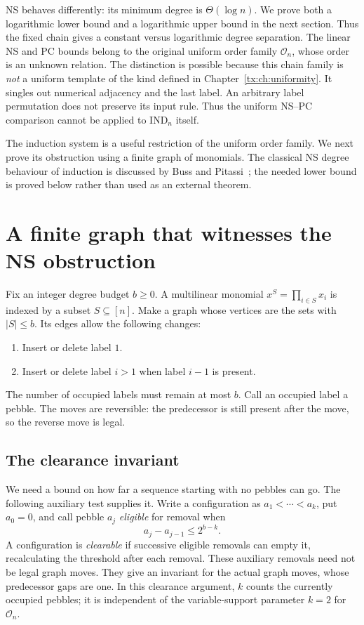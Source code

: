 \documentclass[11pt,a4paper,oneside,openany]{book}
\theoremstyle{definition}\newtheorem{definition}[theorem]{Definition}
\theoremstyle{remark}\newtheorem{remark}[theorem]{Remark}
\numberwithin{equation}{chapter}
\begin{document}
NS behaves differently: its minimum degree is $\Theta(\log n)$.
We prove both a logarithmic lower bound and a logarithmic upper bound
in the next section. Thus the fixed chain gives a constant versus
logarithmic degree separation. The linear NS and PC bounds belong
to the original uniform order family $\mathcal O_n$, whose order is
an unknown relation. The distinction is possible because this chain family is
\emph{not} a uniform template of the kind defined in Chapter~\ref{tx:ch:uniformity}.
It singles out numerical adjacency and the last label. An arbitrary
label permutation does not preserve its input rule. Thus the uniform
NS--PC comparison cannot be applied to $\mathrm{IND}_n$ itself.

The induction system is a useful restriction of the uniform order
family. We next prove its obstruction using a finite graph of
monomials. The classical NS degree behaviour of induction is discussed
by Buss and Pitassi~\cite{BussPitassiInduction}; the needed lower bound
is proved below rather than used as an external theorem.

\section{A finite graph that witnesses the NS obstruction}
Fix an integer degree budget $b\ge0$. A multilinear monomial
$x^S=\prod_{i\in S}x_i$ is indexed by a subset $S\subseteq[n]$.
Make a graph whose vertices are the sets with $|S|\le b$. Its edges
allow the following changes:
\begin{enumerate}
\item Insert or delete label $1$.
\item Insert or delete label $i>1$ when label $i-1$ is present.
\end{enumerate}
The number of occupied labels must remain at most $b$. Call an occupied
label a pebble. The moves are reversible: the predecessor is still
present after the move, so the reverse move is legal.

\subsection{The clearance invariant}
We need a bound on how far a sequence starting with no pebbles can go.
The following auxiliary test supplies it. Write a configuration as
$a_1<\cdots<a_k$, put $a_0=0$, and call pebble $a_j$ \emph{eligible}
for removal when
\begin{equation}\label{tx:eq:order-clearance-test}
                        a_j-a_{j-1}\le2^{b-k}.
\end{equation}
A configuration is \emph{clearable} if successive eligible removals
can empty it, recalculating the threshold after each removal.
These auxiliary removals need not be legal graph moves. They give an
invariant for the actual graph moves, whose predecessor gaps are one.
In this clearance argument, $k$ counts the currently occupied pebbles;
it is independent of the variable-support parameter $k=2$ for
$\mathcal O_n$.
\end{document}
